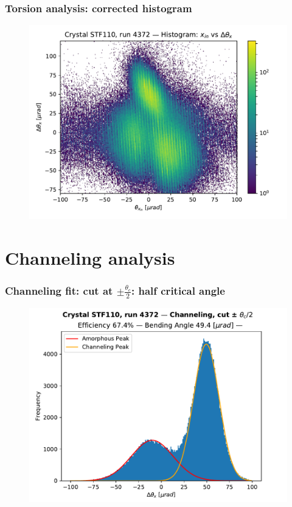 \documentclass[10pt]{beamer}
\begin{document}
\begin{frame}
\frametitle{Torsion analysis: corrected histogram}

\begin{figure}
\includegraphics[width=0.8\linewidth]{corrected_histo.pdf}\\
\end{figure}

\end{frame}












\section{Channeling analysis}

\begin{frame}
\frametitle{Channeling fit: cut at $\pm \frac{\theta_c}{2}$: half critical angle}

\begin{figure}
\includegraphics[width=0.8\linewidth]{half_thetac_chan_histo.pdf}\\
\end{figure}

\end{frame}
\end{document}
